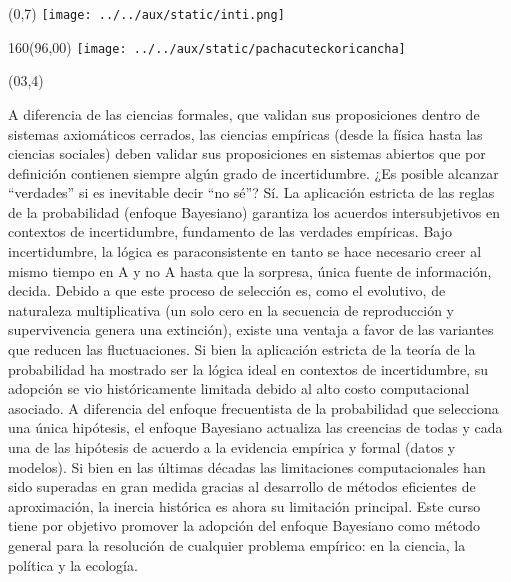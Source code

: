 \documentclass[shownotes,aspectratio=169]{beamer}
\begin{document}
\begin{frame}

\begin{textblock}{96}(0,7)\centering
{\texttt{[image: ../../aux/static/inti.png]}}
\end{textblock}

\begin{textblock}{160}(96,00)
\texttt{[image: ../../aux/static/pachacuteckoricancha]}
\end{textblock}

\begin{textblock}{90}(03,4) \scriptsize
\parbox{9cm}{A diferencia de las ciencias formales, que validan sus proposiciones dentro de sistemas axiomáticos cerrados, las ciencias empíricas (desde la física hasta las ciencias sociales) deben validar sus proposiciones en sistemas abiertos que por definición contienen siempre algún grado de incertidumbre. ¿Es posible alcanzar ``verdades'' si es inevitable decir ``no sé''? Sí. La aplicación estricta de las reglas de la probabilidad (enfoque Bayesiano) garantiza los acuerdos intersubjetivos en contextos de incertidumbre, fundamento de las verdades empíricas. Bajo incertidumbre, la lógica es paraconsistente en tanto se hace necesario creer al mismo tiempo en A y no A hasta que la sorpresa, única fuente de información, decida. Debido a que este proceso de selección es, como el evolutivo, de naturaleza multiplicativa (un solo cero en la secuencia de reproducción y supervivencia genera una extinción), existe una ventaja a favor de las variantes que reducen las fluctuaciones. Si bien la aplicación estricta de la teoría de la probabilidad ha mostrado ser la lógica ideal en contextos de incertidumbre, su adopción se vio históricamente limitada debido al alto costo computacional asociado. A diferencia del enfoque frecuentista de la probabilidad que selecciona una única hipótesis, el enfoque Bayesiano actualiza las creencias de todas y cada una de las hipótesis de acuerdo a la evidencia empírica y formal (datos y modelos). Si bien en las últimas décadas las limitaciones computacionales han sido superadas en gran medida gracias al desarrollo de métodos eficientes de aproximación, la inercia histórica es ahora su limitación principal. Este curso tiene por objetivo promover la adopción del enfoque Bayesiano como método general para la resolución de cualquier problema empírico: en la ciencia, la política y la ecología.}
\end{textblock}

\end{frame}
\end{document}
